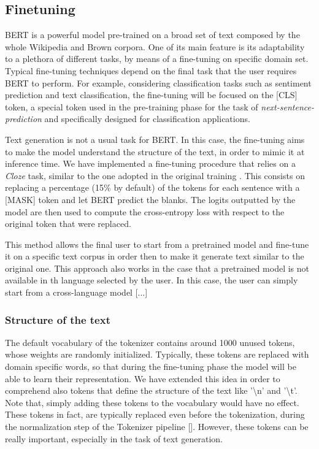 \documentclass[10pt,twocolumn,letterpaper]{article}
\begin{document}
\subsection{Finetuning}
BERT is a powerful model pre-trained on a broad set of text composed by the whole
Wikipedia and Brown corpora.
One of its main feature is its adaptability to a plethora of different tasks,
by means of a fine-tuning on specific domain set.
Typical fine-tuning techniques depend on the final task that the user requires BERT to perform.
For example, considering classification tasks such as sentiment prediction and text classification,
the fine-tuning will be focused on the [CLS] token, a special token used in the pre-training phase for the task
of \textit{next-sentence-prediction} and specifically designed for classification applications.

Text generation is not a usual task for BERT.
In this case, the fine-tuning aims to make the model understand the structure of the text,
in order to mimic it at inference time.
We have implemented a fine-tuning procedure that relies on a \textit{Cloze} task, similar to the one adopted in the
 original training \cite{wang2019bert}.
This consists on replacing a percentage (15\% by default) of the tokens for each sentence with a [MASK] token and let
BERT predict the blanks. The logits outputted by the model are then used to compute the cross-entropy
loss with respect to the original token that were replaced.

This method allows the final user to start from a pretrained model and fine-tune it on a specific
text corpus in order then to make it generate text similar to the original one.
This approach also works  in the case that a pretrained model is not available in th language selected by the user.
In this case, the user can simply start from a cross-language model [...]

\subsubsection{Structure of the text}
The default vocabulary of the tokenizer contains around 1000 unused tokens, whose weights are randomly initialized.
Typically, these tokens are replaced with domain specific words, so that during the fine-tuning phase
the model will be able to learn their representation.
We have extended this idea in order to comprehend also tokens that define the structure of the text like
'\textbackslash n' and '\textbackslash t'.
Note that, simply adding these tokens to the vocabulary would have no effect.
These tokens in fact, are typically replaced even before the tokenization, during the normalization step of the Tokenizer pipeline [].
However, these tokens can be really important, especially in the task of text generation.
\end{document}
